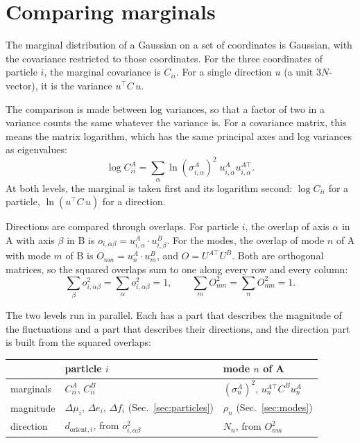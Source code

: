 \documentclass[11pt,a4paper]{article}
\newcommand{\dorient}{d_{\mathrm{orient},i}}
\begin{document}
\section{Comparing marginals}

The marginal distribution of a Gaussian on a set of coordinates is Gaussian, with the covariance restricted to those coordinates. For the three coordinates of particle $i$, the marginal covariance is $C_{ii}$. For a single direction $u$ (a unit $3N$-vector), it is the variance $u^\top C\, u$.

The comparison is made between log variances, so that a factor of two in a variance counts the same whatever the variance is. For a covariance matrix, this means the matrix logarithm, which has the same principal axes and log variances as eigenvalues:
\begin{equation}
\log C^A_{ii} = \sum_\alpha \ln(\sigma^A_{i,\alpha})^2\; u^A_{i,\alpha} u^{A\top}_{i,\alpha} .
\end{equation}
At both levels, the marginal is taken first and its logarithm second: $\log C_{ii}$ for a particle, $\ln(u^\top C\,u)$ for a direction.

Directions are compared through overlaps. For particle $i$, the overlap of axis $\alpha$ in A with axis $\beta$ in B is $o_{i,\alpha\beta} = u^A_{i,\alpha}\cdot u^B_{i,\beta}$. For the modes, the overlap of mode $n$ of A with mode $m$ of B is $O_{nm} = u^A_n\cdot u^B_m$, and $O = U^{A\top}U^B$. Both are orthogonal matrices, so the squared overlaps sum to one along every row and every column:
\begin{equation}
\sum_\beta o^2_{i,\alpha\beta} = \sum_\alpha o^2_{i,\alpha\beta} = 1, \qquad \sum_m O^2_{nm} = \sum_n O^2_{nm} = 1 .
\end{equation}

The two levels run in parallel. Each has a part that describes the magnitude of the fluctuations and a part that describes their directions, and the direction part is built from the squared overlaps:

\begin{center}
\begin{tabular}{lll}
\toprule
 & particle $i$ & mode $n$ of A \\
\midrule
marginals & $C^A_{ii}$, $C^B_{ii}$ & $(\sigma^A_n)^2$, $u^{A\top}_n C^B u^A_n$ \\
magnitude & $\Delta\mu_i$, $\Delta e_i$, $\Delta f_i$ (Sec.~\ref{sec:particles}) & $\rho_n$ (Sec.~\ref{sec:modes}) \\
direction & $\dorient$, from $o^2_{i,\alpha\beta}$ & $N_n$, from $O^2_{nm}$ \\
\bottomrule
\end{tabular}
\end{center}
\end{document}
